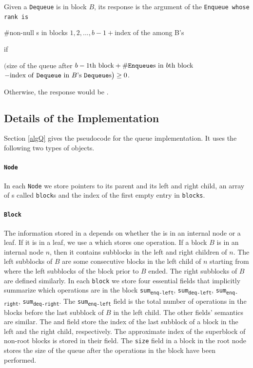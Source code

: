 Given a \texttt{Dequeue} is in block $B$, its response is the argument
of the \tt{Enqueue} whose rank is 
\begin{center}
    \#\textrm{non-null } s in  blocks $1,2,...,b-1 +  $index of the  among B\textrm{'s} 
\end{center}
if \vspace{-3em}
\begin{center}
    $\big ($size of the queue after $b-1\textrm{th block} + \#\textrm{\tt{Enqueue}s in }b\textrm{th block} $\\$- \textrm{index of \tt{Dequeue} in }B\textrm{'s \tt{Dequeue}s} \big )\geq 0$.
\end{center}
Otherwise, the response would be .


\subsection{Details of the Implementation}
Section \ref{algQ} gives the pseudocode for the queue
implementation. It uses the following two types of objects. 
\paragraph{\tt{Node}} 
 In each \texttt{Node} we store pointers to its parent and its left
 and right child, an array of s called \texttt{block}s and
 the index  of the first empty entry in \texttt{blocks}. 

\paragraph{\tt{Block}}
 The information stored in a  depends on whether  the
  is in an internal node or a leaf. If it is in a leaf, we
 use a  which stores one operation. If a block $B$ is in
 an internal node $n$, then it contains subblocks in the left and
 right children of $n$. The left subblocks of $B$ are some consecutive
 blocks in the left child of $n$ starting from where the left
 subblocks of the block prior to $B$ ended. The right subblocks of $B$
 are defined similarly. In each \texttt{block} we store four essential
 fields that implicitly summarize which operations are in the block
 \texttt{sum\textsubscript{enq-left}},
 \texttt{sum\textsubscript{deq-left}},
 \texttt{sum\textsubscript{enq-right}},
 \texttt{sum\textsubscript{deq-right}}. The
 \texttt{sum\textsubscript{enq-left}} field is the total number of
  operations in the blocks before the last subblock of $B$
 in the left child. The other fields' semantics are similar. The
  and  field store the index of
 the last subblock of a block in the left and the right child,
 respectively. The approximate index of the superblock of non-root
 blocks is stored in their  field. The \texttt{size} field
 in a block in the root node stores the size of the queue after the
 operations in the block have been performed.  

